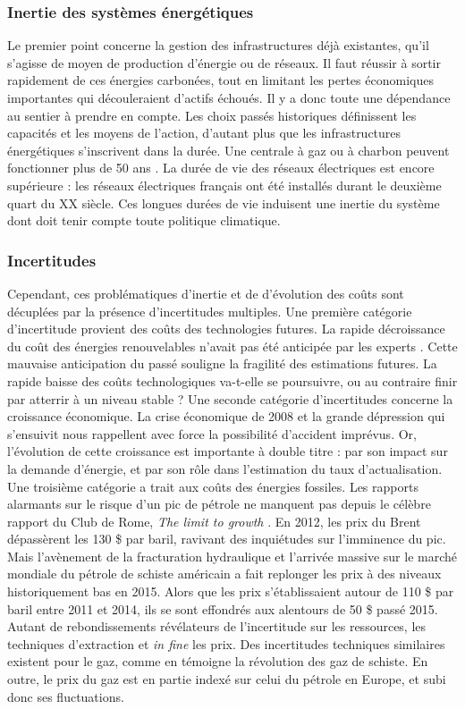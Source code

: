 \subsubsection{Inertie des systèmes énergétiques}
Le premier point concerne la gestion des infrastructures déjà existantes, qu’il s’agisse de moyen de production d’énergie ou de réseaux. Il faut réussir à sortir rapidement de ces énergies carbonées, tout en limitant les pertes économiques importantes qui découleraient d’actifs échoués. Il y a donc toute une dépendance au sentier à prendre en compte. Les choix passés historiques définissent les capacités et les moyens de l’action, d’autant plus que les infrastructures énergétiques s’inscrivent dans la durée. Une centrale à gaz ou à charbon peuvent fonctionner plus de 50 ans \citep{IEA2005}. La durée de vie des réseaux électriques est encore supérieure : les réseaux électriques français ont été installés durant le deuxième quart du XX siècle. Ces longues durées de vie induisent une inertie du système dont doit tenir compte toute politique climatique.

\subsubsection{Incertitudes}
Cependant, ces problématiques d’inertie et de d’évolution des coûts sont décuplées par la présence d’incertitudes multiples.
Une première catégorie d’incertitude provient des coûts des technologies futures. La rapide décroissance du coût des énergies renouvelables n’avait pas été anticipée par les experts \citep{Metayer2015}. Cette mauvaise anticipation du passé souligne la fragilité des estimations futures. La rapide baisse des coûts technologiques va-t-elle se poursuivre, ou au contraire finir par atterrir à un niveau stable ? 
Une seconde catégorie d’incertitudes concerne la croissance économique. La crise économique de 2008 et la grande dépression qui s’ensuivit nous rappellent avec force la possibilité d’accident imprévus. Or, l’évolution de cette croissance est importante à double titre : par son impact sur la demande d’énergie, et par son rôle dans l’estimation du taux d’actualisation. 
Une troisième catégorie a trait aux coûts des énergies fossiles. Les rapports alarmants sur le risque d’un pic de pétrole ne manquent pas depuis le célèbre rapport du Club de Rome, \textit{The limit to growth} \citep{Meadows1972}. En 2012, les prix du Brent dépassèrent les 130 \$ par baril, ravivant des inquiétudes sur l’imminence du pic. Mais l’avènement de la fracturation hydraulique et l’arrivée massive sur le marché mondiale du pétrole de schiste américain a fait replonger les prix à des niveaux historiquement bas en 2015. Alors que les prix s’établissaient autour de 110 \$ par baril entre 2011 et 2014, ils se sont effondrés aux alentours de 50 \$ passé 2015. Autant de rebondissements révélateurs de l’incertitude sur les ressources, les techniques d’extraction et \textit{in fine} les prix. 
Des incertitudes techniques similaires existent pour le gaz, comme en témoigne la révolution des gaz de schiste. En outre, le prix du gaz est en partie indexé sur celui du pétrole en Europe, et subi donc ses fluctuations. 

